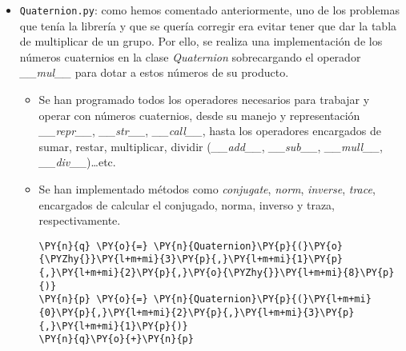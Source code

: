 \begin{itemize}
\begin{itemize}

    \begin{center}
    \end{center}




    \end{itemize}

\item \texttt{Quaternion.py}: como hemos comentado anteriormente, uno de
  los problemas que tenía la librería  y que se quería corregir era evitar tener que dar la tabla de multiplicar de un grupo.
  Por ello, se realiza una implementación de los números cuaternios en
  la clase \textit{Quaternion} sobrecargando el operador
  \textit{\_\_mul\_\_} para dotar a estos números de su producto.
  
  \begin{itemize}
        \item Se han programado todos los operadores necesarios para trabajar y
      operar con números cuaternios, desde su manejo y representación
      \textit{\_\_repr\_\_}, \textit{\_\_str\_\_}, \textit{\_\_call\_\_},
      hasta los operadores encargados de sumar, restar, multiplicar, dividir
      (\textit{\_\_add\_\_}, \textit{\_\_sub\_\_}, \textit{\_\_mull\_\_},
      \textit{\_\_div\_\_})\ldots etc.
        
     \item Se han implementado métodos como \textit{conjugate}, \textit{norm},
      \textit{inverse}, \textit{trace}, encargados de calcular el conjugado,
      norma, inverso y traza, respectivamente.



    \begin{tcolorbox}[breakable, size=fbox, boxrule=1pt, pad at break*=1mm,colback=cellbackground, colframe=cellborder]
\begin{Verbatim}[commandchars=\\\{\}]
\PY{n}{q} \PY{o}{=} \PY{n}{Quaternion}\PY{p}{(}\PY{o}{\PYZhy{}}\PY{l+m+mi}{3}\PY{p}{,}\PY{l+m+mi}{1}\PY{p}{,}\PY{l+m+mi}{2}\PY{p}{,}\PY{o}{\PYZhy{}}\PY{l+m+mi}{8}\PY{p}{)}
\PY{n}{p} \PY{o}{=} \PY{n}{Quaternion}\PY{p}{(}\PY{l+m+mi}{0}\PY{p}{,}\PY{l+m+mi}{2}\PY{p}{,}\PY{l+m+mi}{3}\PY{p}{,}\PY{l+m+mi}{1}\PY{p}{)}
\PY{n}{q}\PY{o}{+}\PY{n}{p}
\end{Verbatim}
\end{tcolorbox}


\end{itemize}
\end{itemize}

